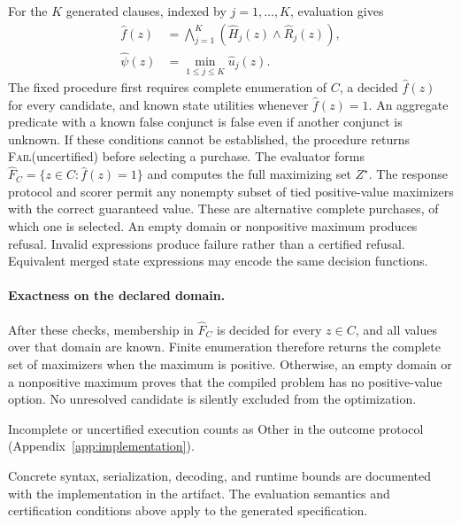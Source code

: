 For the $K$ generated clauses, indexed by $j=1,\ldots,K$, evaluation gives
\begin{align}
\widehat f(z)&=\bigwedge_{j=1}^{K}(\widehat H_j(z)\wedge\widehat R_j(z)),\\
\widehat\psi(z)&=\min_{1\le j\le K}\widehat u_j(z).
\end{align}
The fixed procedure first requires complete enumeration of $C$, a decided $\widehat f(z)$ for every candidate, and known state utilities whenever $\widehat f(z)=1$. An aggregate predicate with a known false conjunct is false even if another conjunct is unknown. If these conditions cannot be established, the procedure returns \textsc{Fail}(uncertified) before selecting a purchase. The evaluator forms $\widehat F_C=\{z\in C:\widehat f(z)=1\}$ and computes the full maximizing set $Z^\star$. The response protocol and scorer permit any nonempty subset of tied positive-value maximizers with the correct guaranteed value. These are alternative complete purchases, of which one is selected. An empty domain or nonpositive maximum produces refusal. Invalid expressions produce failure rather than a certified refusal. Equivalent merged state expressions may encode the same decision functions.

\paragraph{Exactness on the declared domain.}
After these checks, membership in $\widehat F_C$ is decided for every $z\in C$, and all values over that domain are known. Finite enumeration therefore returns the complete set of maximizers when the maximum is positive. Otherwise, an empty domain or a nonpositive maximum proves that the compiled problem has no positive-value option. No unresolved candidate is silently excluded from the optimization.

Incomplete or uncertified execution counts as Other in the outcome protocol (Appendix~\ref{app:implementation}).

Concrete syntax, serialization, decoding, and runtime bounds are documented with the implementation in the artifact. The evaluation semantics and certification conditions above apply to the generated specification.

